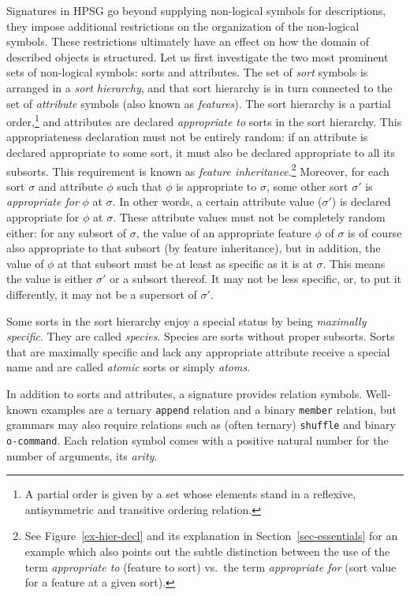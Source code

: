 \documentclass[output=paper
 	        ,biblatex
                ,babelshorthands
                ,newtxmath
                ,draftmode
                ,colorlinks, citecolor=brown
]{langscibook}
\begin{document}
{Signatures in HPSG go beyond supplying non-logical symbols for
descriptions, they impose additional restrictions on the
organization of the non-logical symbols. These restrictions ultimately have an effect on
how the domain of described objects is structured. Let us first
investigate the two most prominent sets of non-logical symbols: sorts
and attributes. The set of \emph{sort} symbols is arranged in a
\emph{sort hierarchy}, and that sort hierarchy is in turn connected to
the set of \emph{attribute} symbols (also known as
\emph{features}). The sort hierarchy is a partial order,\footnote{A partial order is given by a set whose elements stand in a reflexive,
antisymmetric and transitive ordering relation.} and
attributes are declared \emph{appropriate to} sorts
in the sort hierarchy. This appropriateness declaration must not be
entirely random: if an attribute is declared appropriate to some sort,
it must also be declared appropriate to all its subsorts. This requirement
is known as \emph{feature inheritance}.\footnote{See Figure~\ref{ex-hier-decl} and its explanation in Section~\ref{sec-essentials} for an example which also points out the subtle distinction between the use of the term \emph{appropriate to} (feature to sort) vs.\ the term \emph{appropriate for} (sort value for a feature at a given sort).}  Moreover, for each
sort $\sigma$ and attribute $\phi$ such that $\phi$ is appropriate to
$\sigma$, some other sort $\sigma'$ is \emph{appropriate for} $\phi$
at $\sigma$. In other words, a certain attribute value ($\sigma'$) is declared
appropriate for $\phi$ at $\sigma$. These attribute values must not be
completely random either: for any subsort of $\sigma$, the value of an
appropriate feature $\phi$ of $\sigma$ is of course also appropriate
to that subsort (by feature inheritance), but in addition, the value of $\phi$ at that subsort
must be at least as specific as it is at $\sigma$. This means the value is either
$\sigma'$ or a subsort thereof. It may not be less specific, or, to put
it differently, it may not be a
supersort of $\sigma'$.

Some sorts in the sort hierarchy enjoy a special status by being
\emph{maximally specific}. They are called \emph{species}. Species
are sorts without proper subsorts.
Sorts that are maximally specific and lack any appropriate attribute receive
a special name and are called \emph{atomic} sorts or simply \emph{atoms}.

In addition to sorts and attributes, a signature provides relation
symbols.  Well-known examples are a ternary \texttt{append} relation
and a binary \texttt{member} relation, but grammars may also require
relations such as (often ternary) \texttt{shuffle} and binary
\texttt{o-command}. Each relation symbol comes with
a positive natural number for the number of arguments, its \emph{arity}.

}
\end{document}
